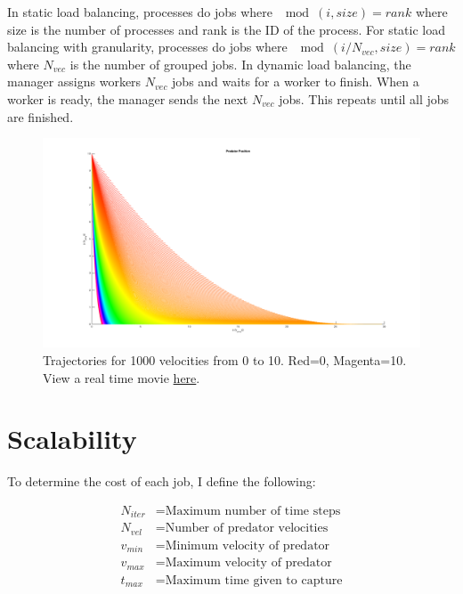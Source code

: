 \documentclass{article}
\begin{document}
In static load balancing, processes do jobs where $\mod(i,size)=rank$ where size is the number of processes and rank is the ID of the process.
For static load balancing with granularity, processes do jobs where $\mod(i/N_{vec},size)=rank$ where $N_{vec}$ is the number of grouped jobs.
In dynamic load balancing, the manager assigns workers $N_{vec}$ jobs and waits for a worker to finish.
When a worker is ready, the manager sends the next $N_{vec}$ jobs.
This repeats until all jobs are finished.

\begin{figure}[H]
\includegraphics[width=\textwidth]{trajectories.png}
\caption{Trajectories for 1000 velocities from 0 to 10. Red=0, Magenta=10.
View a real time movie \href{run:./trajectories.mp4}{here}.}
\end{figure}

\section{Scalability}

To determine the cost of each job, I define the following:

\begin{align*}
N_{iter} &= \text{Maximum number of time steps} \\
N_{vel} &= \text{Number of predator velocities} \\
v_{min} &= \text{Minimum velocity of predator} \\
v_{max} &= \text{Maximum velocity of predator} \\
t_{max} &= \text{Maximum time given to capture}
\end{align*}
\end{document}
